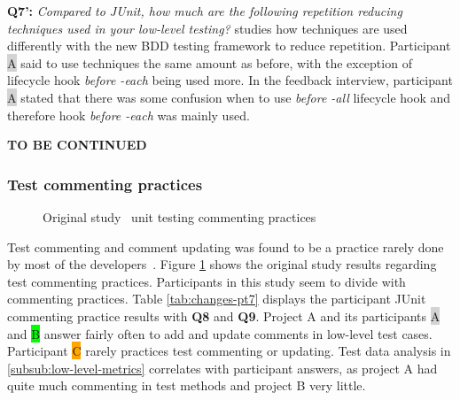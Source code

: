 \textbf{Q7':} \textit{Compared to JUnit, how much are the following repetition reducing techniques used in your low-level testing?}
studies how techniques are used differently with the new BDD testing framework to reduce repetition. Participant {\colorbox{lightgray}A}
said to use techniques the same amount as before, with the exception of lifecycle hook \textit{before -each} being used more.
In the feedback interview, participant {\colorbox{lightgray}A} stated that there was some confusion when to use \textit{before -all}
lifecycle hook and therefore hook \textit{before -each} was mainly used.

\textbf{TO BE CONTINUED}
\clearpage
\subsubsection{Test commenting practices}
    \begin{figure}[ht]%
        \centering
        \qquad
        \caption{Original study~\cite{li2016automatically} unit testing commenting practices}%
        \label{fig:org-commenting}%
    \end{figure}

Test commenting and comment updating was found to be a practice rarely done by most of the developers~\cite{li2016automatically}.
Figure \ref{fig:org-commenting} shows the original study results regarding test commenting practices. Participants in this
study seem to divide with commenting practices. Table \ref{tab:changes-pt7} displays the participant JUnit commenting practice results with
\textbf{Q8} and \textbf{Q9}. Project A and its participants {\colorbox{lightgray}A} and {\colorbox{lime}B}
answer fairly often to add and update comments in low-level test cases. Participant {\colorbox{orange}C} rarely practices
test commenting or updating. Test data analysis in \ref{subsub:low-level-metrics} correlates with participant answers, as
project A had quite much commenting in test methods and project B very little.


